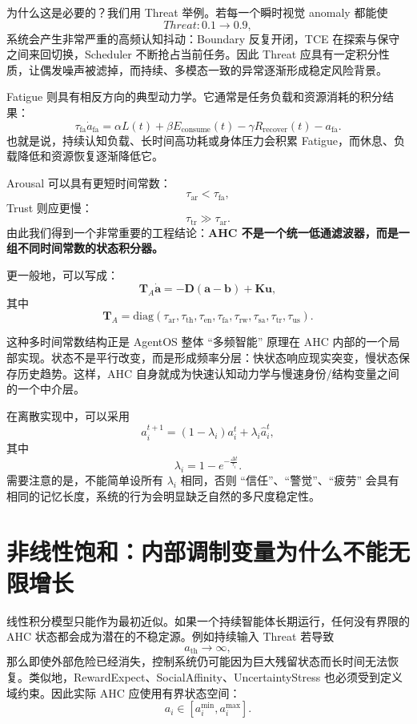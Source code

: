 为什么这是必要的？我们用 Threat 举例。若每一个瞬时视觉 anomaly 都能使
\[
Threat:0.1\rightarrow0.9,
\]
系统会产生非常严重的高频认知抖动：Boundary 反复开闭，TCE 在探索与保守之间来回切换，Scheduler 不断抢占当前任务。因此 Threat 应具有一定积分性质，让偶发噪声被滤掉，而持续、多模态一致的异常逐渐形成稳定风险背景。

Fatigue 则具有相反方向的典型动力学。它通常是任务负载和资源消耗的积分结果：
\[
\tau_{\mathrm{fa}}
\dot a_{\mathrm{fa}}
=
\alpha L(t)
+
\beta E_{\mathrm{consume}}(t)
-
\gamma R_{\mathrm{recover}}(t)
-
a_{\mathrm{fa}}.
\]
也就是说，持续认知负载、长时间高功耗或身体压力会积累 Fatigue，而休息、负载降低和资源恢复逐渐降低它。

Arousal 可以具有更短时间常数：
\[
\tau_{\mathrm{ar}}
<
\tau_{\mathrm{fa}},
\]
Trust 则应更慢：
\[
\tau_{\mathrm{tr}}
\gg
\tau_{\mathrm{ar}}.
\]
由此我们得到一个非常重要的工程结论：\textbf{AHC 不是一个统一低通滤波器，而是一组不同时间常数的状态积分器。}

更一般地，可以写成：
\[
\mathbf T_A\dot{\mathbf a}
=
-\mathbf D
(\mathbf a-\mathbf b)
+
\mathbf K\mathbf u,
\]
其中
\[
\mathbf T_A
=
\mathrm{diag}
(
\tau_{\mathrm{ar}},
\tau_{\mathrm{th}},
\tau_{\mathrm{en}},
\tau_{\mathrm{fa}},
\tau_{\mathrm{rw}},
\tau_{\mathrm{sa}},
\tau_{\mathrm{tr}},
\tau_{\mathrm{us}}
).
\]

这种多时间常数结构正是 AgentOS 整体 ``多频智能'' 原理在 AHC 内部的一个局部实现。状态不是平行改变，而是形成频率分层：快状态响应现实突变，慢状态保存历史趋势。这样，AHC 自身就成为快速认知动力学与慢速身份/结构变量之间的一个中介层。

在离散实现中，可以采用
\[
a_i^{t+1}
=
(1-\lambda_i)a_i^t
+
\lambda_i
\hat a_i^t,
\]
其中
\[
\lambda_i
=
1-e^{-\frac{\Delta t}{\tau_i}}.
\]
需要注意的是，不能简单设所有 $\lambda_i$ 相同，否则 ``信任''、``警觉''、``疲劳'' 会具有相同的记忆长度，系统的行为会明显缺乏自然的多尺度稳定性。


\section{非线性饱和：内部调制变量为什么不能无限增长}

线性积分模型只能作为最初近似。如果一个持续智能体长期运行，任何没有界限的 AHC 状态都会成为潜在的不稳定源。例如持续输入 Threat 若导致
\[
a_{\mathrm{th}}\rightarrow\infty,
\]
那么即使外部危险已经消失，控制系统仍可能因为巨大残留状态而长时间无法恢复。类似地，RewardExpect、SocialAffinity、UncertaintyStress 也必须受到定义域约束。因此实际 AHC 应使用有界状态空间：
\[
a_i\in[a_i^{\min},a_i^{\max}].
\]

